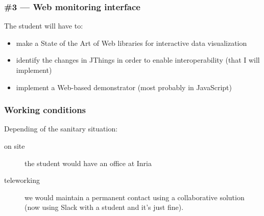 \documentclass[11pt]{beamer}
\begin{document}
\begin{frame}
\frametitle{\#3 ---  Web monitoring interface}
The student will have to:
\begin{itemize}
	\item make a State of the Art of Web libraries for interactive data visualization
	\item identify the changes in JThings in order to enable interoperability (that I will implement)
	\item implement a Web-based demonstrator (most probably in JavaScript)
\end{itemize}
\end{frame}


\begin{frame}
\frametitle{Working conditions}
Depending of the sanitary situation:
\begin{description}
	\item[on site] the student would have an office at Inria
	\item[teleworking] we would maintain a permanent contact using a collaborative solution (now using  Slack with a student and it's just fine).
\end{description}
\end{frame}
\end{document}
